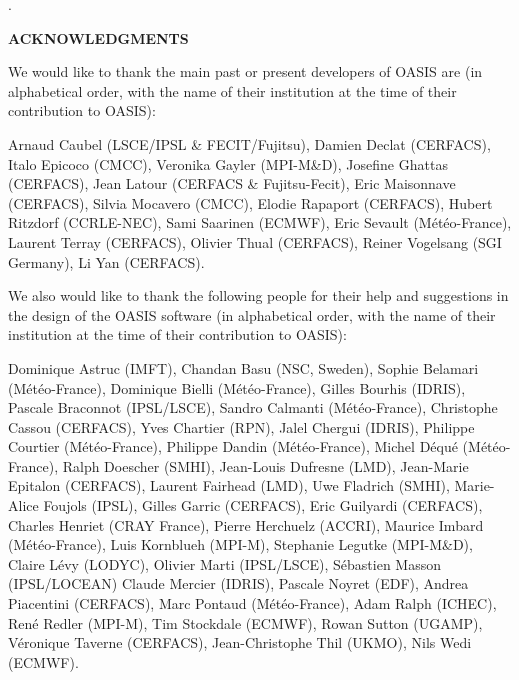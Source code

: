\newpage

.

\vspace{3cm}

{\bf ACKNOWLEDGMENTS}
 
\vspace{1.5cm}
 We would like to thank the main past or present developers of OASIS
are (in alphabetical order, with the name of their institution at the time of their contribution to OASIS):

Arnaud Caubel (LSCE/IPSL \& FECIT/Fujitsu),
Damien Declat (CERFACS),
Italo Epicoco (CMCC),
Veronika Gayler (MPI-M\&D),
Josefine Ghattas (CERFACS),
Jean Latour (CERFACS \& Fujitsu-Fecit),
Eric Maisonnave (CERFACS),
Silvia Mocavero (CMCC),
Elodie Rapaport (CERFACS),
Hubert Ritzdorf (CCRLE-NEC),
Sami Saarinen (ECMWF),
Eric Sevault (M\'et\'eo-France),
Laurent Terray (CERFACS),
Olivier Thual (CERFACS),
Reiner Vogelsang (SGI Germany),
Li Yan (CERFACS).

\vspace{0.5cm}
We also would like to thank the following people for their help
and suggestions in the design of the OASIS software (in alphabetical
order, with the name of their institution at the time of their contribution to OASIS):

Dominique Astruc (IMFT),
Chandan Basu (NSC, Sweden),
Sophie Belamari (M\'et\'eo-France),
Dominique Bielli (M\'et\'eo-France),
Gilles Bourhis (IDRIS),
Pascale Braconnot (IPSL/LSCE),
Sandro Calmanti (M\'et\'eo-France),
Christophe Cassou (CERFACS),
Yves Chartier (RPN),
Jalel Chergui (IDRIS),
Philippe Courtier (M\'et\'eo-France),
Philippe Dandin (M\'et\'eo-France),
Michel D\'equ\'e (M\'et\'eo-France),
Ralph Doescher (SMHI),
Jean-Louis Dufresne (LMD),
Jean-Marie Epitalon (CERFACS),
Laurent Fairhead (LMD),
Uwe Fladrich (SMHI),
Marie-Alice Foujols (IPSL),
Gilles Garric (CERFACS),
Eric Guilyardi (CERFACS),
Charles Henriet (CRAY France),
Pierre Herchuelz (ACCRI),
Maurice Imbard (M\'et\'eo-France),
Luis Kornblueh (MPI-M),
Stephanie Legutke (MPI-M\&D),
Claire L\'evy (LODYC),
Olivier Marti (IPSL/LSCE),
S\'ebastien Masson (IPSL/LOCEAN)
Claude Mercier (IDRIS),
Pascale Noyret (EDF),
Andrea Piacentini (CERFACS),
Marc Pontaud (M\'et\'eo-France),
Adam Ralph (ICHEC),
Ren\'e Redler (MPI-M),
Tim Stockdale (ECMWF),
Rowan Sutton (UGAMP),
V\'eronique Taverne (CERFACS),
Jean-Christophe Thil (UKMO),
Nils Wedi (ECMWF).



